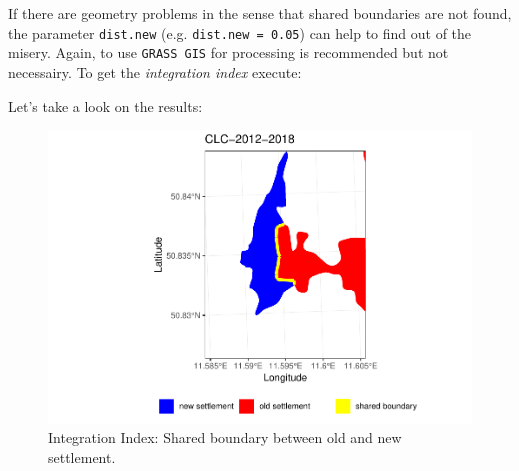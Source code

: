 \documentclass[]{article}
\newenvironment{Shaded}{\begin{snugshade}}{\end{snugshade}}
\newcommand{\KeywordTok}[1]{\textcolor[rgb]{0.13,0.29,0.53}{\textbf{#1}}}
\newcommand{\DataTypeTok}[1]{\textcolor[rgb]{0.13,0.29,0.53}{#1}}
\newcommand{\DecValTok}[1]{\textcolor[rgb]{0.00,0.00,0.81}{#1}}
\newcommand{\StringTok}[1]{\textcolor[rgb]{0.31,0.60,0.02}{#1}}
\newcommand{\CommentTok}[1]{\textcolor[rgb]{0.56,0.35,0.01}{\textit{#1}}}
\newcommand{\OtherTok}[1]{\textcolor[rgb]{0.56,0.35,0.01}{#1}}
\newcommand{\OperatorTok}[1]{\textcolor[rgb]{0.81,0.36,0.00}{\textbf{#1}}}
\newcommand{\NormalTok}[1]{#1}
\begin{document}
If there are geometry problems in the sense that shared boundaries are
not found, the parameter \texttt{dist.new} (e.g.
\texttt{dist.new\ =\ 0.05}) can help to find out of the misery. Again,
to use \texttt{GRASS\ GIS} for processing is recommended but not
necessairy. To get the \emph{integration index} execute:

\begin{Shaded}
\end{Shaded}

Let's take a look on the results:

\begin{figure}[!h]

{\centering \includegraphics{vignette_files/figure-latex/unnamed-chunk-11-1} 

}

\caption{Integration Index: Shared boundary between old and new settlement.}\label{fig:unnamed-chunk-11}
\end{figure}
\end{document}
